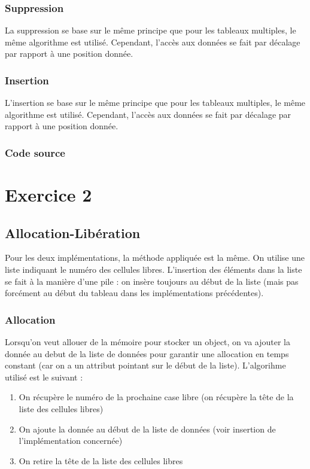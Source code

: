 \documentclass{report}
\begin{document}
      \subsection{Suppression}
        La suppression se base sur le même principe que pour les tableaux multiples, le même algorithme est utilisé. Cependant, l'accès aux données se fait par décalage par rapport à une position donnée.
      \subsection{Insertion}
        L'insertion se base sur le même principe que pour les tableaux multiples, le même algorithme est utilisé. Cependant, l'accès aux données se fait par décalage par rapport à une position donnée.
      \subsection{Code source}
        
        
  \chapter*{Exercice 2}
  \addtocounter{chapter}{1}
  \setcounter{section}{0}
    \section{Allocation-Libération}
      Pour les deux implémentations, la méthode appliquée est la même. On utilise une liste indiquant le numéro des cellules libres. L'insertion des éléments dans la liste se fait à la manière d'une pile : on insère toujours au début de la liste (mais pas forcément au début du tableau dans les implémentations précédentes).
      \subsection{Allocation}
        Lorsqu'on veut allouer de la mémoire pour stocker un object, on va ajouter la donnée au debut de la liste de données pour garantir une allocation en temps constant (car on a un attribut pointant sur le début de la liste). 
        L'algorihme utilisé est le suivant :
        \begin{enumerate}
          \item On récupère le numéro de la prochaine case libre (on récupère la tête de la liste des cellules libres)
          \item On ajoute la donnée au début de la liste de données (voir insertion de l'implémentation concernée)
          \item On retire la tête de la liste des cellules libres
        \end{enumerate}
\end{document}
